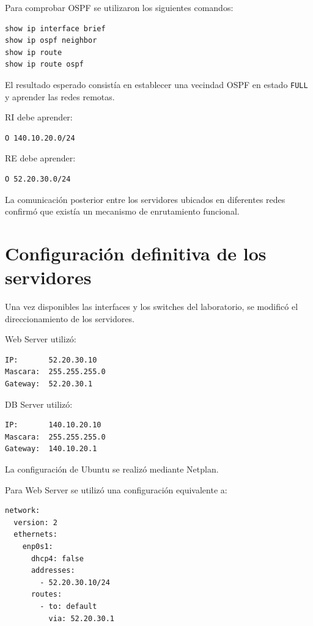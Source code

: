 \documentclass[12pt,a4paper]{article}
\begin{document}
Para comprobar OSPF se utilizaron
los siguientes comandos:

\begin{lstlisting}
show ip interface brief
show ip ospf neighbor
show ip route
show ip route ospf
\end{lstlisting}

El resultado esperado consistía
en establecer una vecindad OSPF
en estado \texttt{FULL} y
aprender las redes remotas.

RI debe aprender:

\begin{lstlisting}
O 140.10.20.0/24
\end{lstlisting}

RE debe aprender:

\begin{lstlisting}
O 52.20.30.0/24
\end{lstlisting}

La comunicación posterior
entre los servidores ubicados
en diferentes redes confirmó
que existía un mecanismo de
enrutamiento funcional.

\section{Configuración definitiva de los servidores}

Una vez disponibles las interfaces
y los switches del laboratorio,
se modificó el direccionamiento
de los servidores.

Web Server utilizó:

\begin{lstlisting}
IP:       52.20.30.10
Mascara:  255.255.255.0
Gateway:  52.20.30.1
\end{lstlisting}

DB Server utilizó:

\begin{lstlisting}
IP:       140.10.20.10
Mascara:  255.255.255.0
Gateway:  140.10.20.1
\end{lstlisting}

La configuración de Ubuntu
se realizó mediante Netplan.

Para Web Server se utilizó
una configuración equivalente a:

\begin{lstlisting}
network:
  version: 2
  ethernets:
    enp0s1:
      dhcp4: false
      addresses:
        - 52.20.30.10/24
      routes:
        - to: default
          via: 52.20.30.1
\end{lstlisting}
\end{document}
